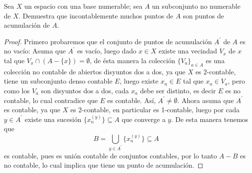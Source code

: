 
\item Sea $X$ un espacio con una base numerable; sea $A$ un subconjunto no numerable de $X$. Demuestra que incontablemente muchos puntos de $A$ son puntos de acumulación de $A$.

\begin{proof}
    Primero probaremos que el conjunto de puntos de acumulación $A^\prime$ de $A$ es no vacío: Asuma que $A^\prime$ es vacío, luego dado $x \in X$
    existe una vecindad $V_x$ de $x$ tal que $V_x \cap (A - \{x\}) = \emptyset$, de ésta manera la colección $\{V_a\}_{a \in A}$ es una colección no contable de abiertos disyuntos dos a dos, ya que $X$ es 2-contable, tiene un subconjunto denso contable $E$, luego existe $x_a \in E$ tal que $x_a \in V_a$, pero como los $V_a$ son disyuntos dos a dos, cada $x_a$ debe ser distinto, es decir $E$ es no contable, lo cual contradice que $E$ es contable. Así, $A^\prime \neq \emptyset$.
    Ahora asuma que $A^\prime$ es contable, ya que $X$ es 2-contable, en particular es 1-contable, luego por cada $y \in A^\prime$ existe una sucesión $\{x_n^{(y)}\}  \subseteq A$ que converge a $y$. De esta manera tenemos que
    \begin{equation*}
        B = \bigcup_{y \in A^\prime} \{x_n^{(y)}\} \subseteq A
    \end{equation*}
    es contable, pues es unión contable de conjuntos contables, por lo tanto $A - B$ es no contable, lo cual implica que tiene un punto de acumulación.
\end{proof}